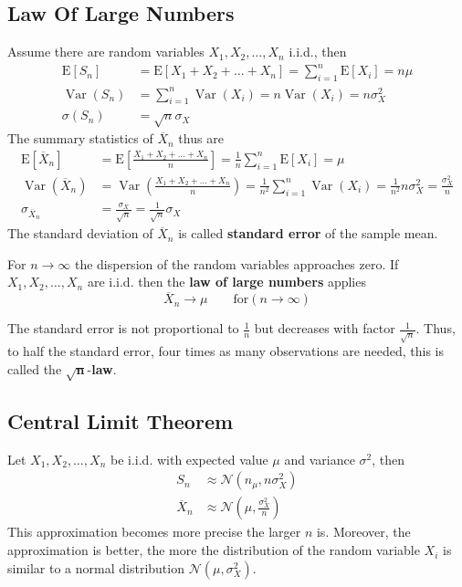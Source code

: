 \documentclass[11pt]{article}
\theoremstyle{definition}
\newcommand*\samplemean[1]{\overline{#1}}
\newcommand*\ev[1]{\mathrel{\text{E}\left[#1\right]}}
\newcommand*\N[1]{\mathcal{N}\left(#1\right)}
\newcommand*\Var[1]{\mathop{\text{Var}}\left(#1\right)}
\begin{document}
\subsection{Law Of Large Numbers}
Assume there are random variables $X_1,X_2,\dots,X_n$ i.i.d., then
\begin{align*}
	\ev{S_n} &= \ev{X_1 + X_2 + \dots + X_n} = \sum_{i=1}^{n} \ev{X_i} = n\mu\\
	\Var{S_n} &= \sum_{i=1}^{n}\Var{X_i} = n\Var{X_i} = n\sigma_X^2\\
	\sigma(S_n) &= \sqrt{n}\sigma_X
\end{align*}
The summary statistics of $\samplemean{X}_n$ thus are
\begin{align*}
	\ev{\samplemean{X}_n} &= \ev{\frac{X_1 + X_2 + \dots + X_n}{n}} = \frac{1}{n} \sum_{i=1}^{n} \ev{X_i} = \mu\\
	\Var{\samplemean{X}_n} &= \Var{\frac{X_1 + X_2 + \dots + X_n}{n}} = \frac{1}{n^2} \sum_{i=1}^{n}\Var{X_i}  = \frac{1}{n^2}n\sigma_X^2 = \frac{\sigma_X^2}{n}\\
	\sigma_{\samplemean{X}_n} &= \frac{\sigma_X}{\sqrt{n}} = \frac{1}{\sqrt{n}} \sigma_X
\end{align*}
The standard deviation of $\samplemean{X}_n$ is called \textbf{standard error} of the sample mean.
\begin{definition}
	For $n\rightarrow\infty$ the dispersion of the random variables approaches zero. If $X_1,X_2,\dots,X_n$ are i.i.d. then the \textbf{law of large numbers} applies
	\begin{equation*}
		\samplemean{X}_n \longrightarrow \mu \qquad\text{for} (n\rightarrow\infty)
	\end{equation*}
\end{definition}
The standard error is not proportional to $\frac{1}{n}$ but decreases with factor $\frac{1}{\sqrt{n}}$. Thus, to half the standard error, four times as many observations are needed, this is called the $\bm{\sqrt{n}}$-\textbf{law}.

\subsection{Central Limit Theorem}
\begin{definition}
	Let $X_1,X_2,\dots,X_n$ be i.i.d. with expected value $\mu$ and variance $\sigma^2$, then
	\begin{align*}
		S_n &\approx \N{n_\mu, n\sigma_X^2}\\
		\samplemean{X}_n &\approx \N{\mu,\frac{\sigma_X^2}{n}}
	\end{align*}
	This approximation becomes more precise the larger $n$ is. Moreover, the approximation is better, the more the distribution of the random variable $X_i$ is similar to a normal distribution $\N{\mu,\sigma_X^2}$.
\end{definition}
\end{document}
